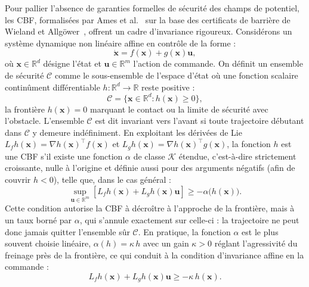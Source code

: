 Pour pallier l'absence de garanties formelles de sécurité des champs de potentiel, les \ac{CBF}, formalisées par Ames et al.~\cite{Ames2019Control} sur la base des certificats de barrière de Wieland et Allgöwer~\cite{Wieland2007Constructive}, offrent un cadre d'invariance rigoureux. Considérons un système dynamique non linéaire affine en contrôle de la forme :
\begin{equation}
\dot{\mathbf{x}} = f(\mathbf{x}) + g(\mathbf{x})\mathbf{u},
\end{equation}
où $\mathbf{x} \in \mathbb{R}^d$ désigne l'état et $\mathbf{u} \in \mathbb{R}^m$ l'action de commande. On définit un ensemble de sécurité $\mathcal{C}$ comme le sous-ensemble de l'espace d'état où une fonction scalaire continûment différentiable $h: \mathbb{R}^d \to \mathbb{R}$ reste positive :
\begin{equation}
\mathcal{C} = \{ \mathbf{x} \in \mathbb{R}^d : h(\mathbf{x}) \geq 0 \},
\end{equation}
la frontière $h(\mathbf{x})=0$ marquant le contact ou la limite de sécurité avec l'obstacle. L'ensemble $\mathcal{C}$ est dit invariant vers l'avant si toute trajectoire débutant dans $\mathcal{C}$ y demeure indéfiniment. En exploitant les dérivées de Lie $L_f h(\mathbf{x}) = \nabla h(\mathbf{x})^\top f(\mathbf{x})$ et $L_g h(\mathbf{x}) = \nabla h(\mathbf{x})^\top g(\mathbf{x})$, la fonction $h$ est une \ac{CBF} s'il existe une fonction $\alpha$ de classe $\mathcal{K}$ étendue, c'est-à-dire strictement croissante, nulle à l'origine et définie aussi pour des arguments négatifs (afin de couvrir $h<0$), telle que, dans le cas général :
\begin{equation}
\label{eq:cbf_condition_general}
\sup_{\mathbf{u} \in \mathbb{R}^m} \left[ L_f h(\mathbf{x}) + L_g h(\mathbf{x})\mathbf{u} \right] \geq -\alpha\big(h(\mathbf{x})\big).
\end{equation}
Cette condition autorise la \ac{CBF} à décroître à l'approche de la frontière, mais à un taux borné par $\alpha$, qui s'annule exactement sur celle-ci : la trajectoire ne peut donc jamais quitter l'ensemble sûr $\mathcal{C}$. En pratique, la fonction $\alpha$ est le plus souvent choisie linéaire, $\alpha(h) = \kappa\, h$ avec un gain $\kappa > 0$ réglant l'agressivité du freinage près de la frontière, ce qui conduit à la condition d'invariance affine en la commande :
\begin{equation}
\label{eq:cbf_condition}
L_f h(\mathbf{x}) + L_g h(\mathbf{x})\mathbf{u} \geq -\kappa\, h(\mathbf{x}).
\end{equation}
